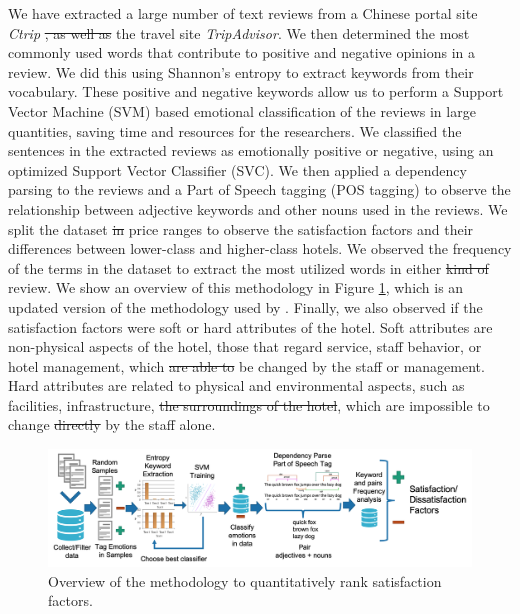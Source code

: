 \documentclass[smallextended,natbib]{svjour3}       %
\providecommand{\DIFadd}[1]{{\protect\color{blue}\uwave{#1}}} %
\providecommand{\DIFdel}[1]{{\protect\color{red}\sout{#1}}}                      %
\providecommand{\DIFaddbegin}{} %
\providecommand{\DIFaddend}{} %
\providecommand{\DIFdelbegin}{} %
\providecommand{\DIFdelend}{} %
\newcommand{\DIFscaledelfig}{0.5}
\newlength{\DIFdelgraphicswidth} %
\newlength{\DIFdelgraphicsheight} %
\newcommand{\DIFaddincludegraphics}[2][]{{\color{blue}\fbox{\DIFOincludegraphics[#1]{#2}}}} %
\newcommand{\DIFdelincludegraphics}[2][]{%
\sbox{\DIFdelgraphicsbox}{\DIFOincludegraphics[#1]{#2}}%
\settoboxwidth{\DIFdelgraphicswidth}{\DIFdelgraphicsbox} %
\settoboxtotalheight{\DIFdelgraphicsheight}{\DIFdelgraphicsbox} %
\scalebox{\DIFscaledelfig}{%
\parbox[b]{\DIFdelgraphicswidth}{\usebox{\DIFdelgraphicsbox}\\[-\baselineskip] \rule{\DIFdelgraphicswidth}{0em}}\llap{\resizebox{\DIFdelgraphicswidth}{\DIFdelgraphicsheight}{%
\setlength{\unitlength}{\DIFdelgraphicswidth}%
\begin{picture}(1,1)%
\thicklines\linethickness{2pt} %
{\color[rgb]{1,0,0}\put(0,0){\framebox(1,1){}}}%
{\color[rgb]{1,0,0}\put(0,0){\line( 1,1){1}}}%
{\color[rgb]{1,0,0}\put(0,1){\line(1,-1){1}}}%
\end{picture}%
}\hspace*{3pt}}} %
} %
\DeclareRobustCommand{\DIFaddbegin}{\DIFOaddbegin \let\includegraphics\DIFaddincludegraphics} %
\DeclareRobustCommand{\DIFaddend}{\DIFOaddend \let\includegraphics\DIFOincludegraphics} %
\DeclareRobustCommand{\DIFdelbegin}{\DIFOdelbegin \let\includegraphics\DIFdelincludegraphics} %
\DeclareRobustCommand{\DIFdelend}{\DIFOaddend \let\includegraphics\DIFOincludegraphics} %
\begin{document}
  We have extracted a large number of text reviews from a Chinese portal site \textit{Ctrip} \DIFdelbegin \DIFdel{, as well as }\DIFdelend \DIFaddbegin \DIFadd{and }\DIFaddend the travel site \textit{TripAdvisor}. We then determined the most commonly used words that contribute to positive and negative opinions in a review. We did this using Shannon's entropy to extract keywords from their vocabulary. These positive and negative keywords allow us to perform a Support Vector Machine (SVM) based emotional classification of the reviews in large quantities, saving time and resources for the researchers. We classified the sentences in the extracted reviews as emotionally positive or negative, using an optimized Support Vector Classifier (SVC). We then applied a dependency parsing to the reviews and a Part of Speech tagging (POS tagging) to observe the relationship between adjective keywords and other nouns used in the reviews. We split the dataset \DIFdelbegin \DIFdel{in }\DIFdelend \DIFaddbegin \DIFadd{into }\DIFaddend price ranges to observe the satisfaction factors and their differences between lower-class and higher-class hotels. We observed the frequency of the terms in the dataset to extract the most utilized words in either \DIFdelbegin \DIFdel{kind of }\DIFdelend review. We show an overview of this methodology in Figure \ref{fig:method-overview}, which is an updated version of the methodology used by \cite{Aleman2018ICAROB}. Finally, we also observed if the satisfaction factors were soft or hard attributes of the hotel. Soft attributes are non-physical aspects of the hotel, those that regard service, staff behavior, or hotel management, which \DIFdelbegin \DIFdel{are able to }\DIFdelend \DIFaddbegin \DIFadd{can }\DIFaddend be changed by the staff or management. Hard attributes are related to physical and environmental aspects, such as facilities,  infrastructure, \DIFdelbegin \DIFdel{the surroundings of the hotel}\DIFdelend \DIFaddbegin \DIFadd{and the hotel's surroundings}\DIFaddend , which are impossible to change \DIFdelbegin \DIFdel{directly }\DIFdelend by the staff alone.

  \begin{figure}[bp]
  \centering
  \includegraphics[width=\textwidth]{emotion-method-overview_V3.png}
  \caption{Overview of the methodology to quantitatively rank satisfaction factors.}
  \label{fig:method-overview}
  \end{figure}
\end{document}
